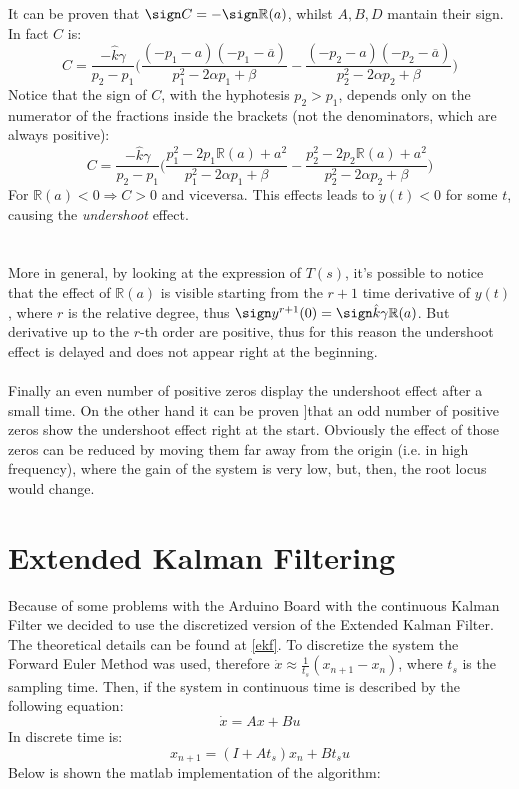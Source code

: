 It can be proven that $\sign C =  - \sign \mathbb{R}(a)$, whilst $A,B,D$ mantain their sign. In fact $C$ is:
$$C=\frac{-\hat{k}\gamma}{p_2-p_1} \Big( \frac{(-p_1-a)(-p_1-\overline{a})}{p_1^2-2\alpha p_1+\beta} -\frac{(-p_2-a)(-p_2-\overline{a})}{p_2^2-2\alpha p_2+\beta} \Big) $$
Notice that the sign of $C$, with the hyphotesis $p_2 > p_1$, depends only on the numerator of the fractions inside the brackets (not the denominators, which are always positive):
$$C=\frac{-\hat{k}\gamma}{p_2-p_1}\Big ( \frac{p_1^2 -2p_1 \mathbb{R}(a) +a^2}{p_1^2-2\alpha p_1+\beta} -\frac{p_2^2 -2p_2 \mathbb{R}(a) +a^2}{p_2^2-2\alpha p_2+\beta} \Big)$$
For $\mathbb{R}(a) < 0 \Rightarrow C > 0$ and viceversa. This effects leads to $\dot{y}(t) <0$ for some $t$, causing the \emph{undershoot} effect.  \\ \\ \\
More in general, by looking at the expression of $T(s)$, it's possible to notice that the effect of $\mathbb{R}(a)$ is visible starting from the $r+1$ time derivative of $y(t)$, where $r$ is the relative degree, thus $\sign y^{r+1}(0)  = \sign \hat{k}\gamma \mathbb{R}(a)$. But derivative up to the $r$-th order are positive, thus for this reason the undershoot effect is delayed and does not appear right at the beginning. \\ \\
Finally an even number of positive zeros display the undershoot effect  after a small time. On the other hand it can be proven  \cite{hoagg2006}]that an odd number of positive zeros show the undershoot effect right at the start. Obviously the effect of those zeros can be reduced by moving them far away from the origin (i.e. in high frequency), where the gain of the system is very low,  but, then, the root locus would change. \\

\section{Extended Kalman Filtering}
Because of some problems with the Arduino Board with the continuous Kalman Filter we decided to use the discretized version of the Extended Kalman Filter. The theoretical details can be found at \ref{ekf}. To discretize the system the Forward Euler Method was used, therefore $\dot{x} \approx \frac{1}{t_s}(x_{n+1}-x_{n})$, where $t_s$ is the sampling time. Then, if the system in continuous time is described by the following equation:
\begin{equation}
\dot{x}=Ax+Bu
\end{equation}
In discrete time is:
\begin{equation}
x_{n+1}=(I+At_s)x_n + B t_s u
\end{equation}
Below is shown the matlab implementation of the algorithm:

